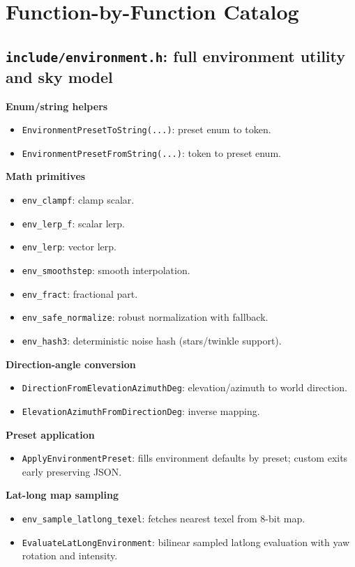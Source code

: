 \documentclass[11pt]{article}
\begin{document}
\section{Function-by-Function Catalog}
\subsection{\texttt{include/environment.h}: full environment utility and sky model}
\textbf{Enum/string helpers}
\begin{itemize}[leftmargin=1.5em]
  \item \verb|EnvironmentPresetToString(...)|: preset enum to token.
  \item \verb|EnvironmentPresetFromString(...)|: token to preset enum.
\end{itemize}

\textbf{Math primitives}
\begin{itemize}[leftmargin=1.5em]
  \item \verb|env_clampf|: clamp scalar.
  \item \verb|env_lerp_f|: scalar lerp.
  \item \verb|env_lerp|: vector lerp.
  \item \verb|env_smoothstep|: smooth interpolation.
  \item \verb|env_fract|: fractional part.
  \item \verb|env_safe_normalize|: robust normalization with fallback.
  \item \verb|env_hash3|: deterministic noise hash (stars/twinkle support).
\end{itemize}

\textbf{Direction-angle conversion}
\begin{itemize}[leftmargin=1.5em]
  \item \verb|DirectionFromElevationAzimuthDeg|: elevation/azimuth to world direction.
  \item \verb|ElevationAzimuthFromDirectionDeg|: inverse mapping.
\end{itemize}

\textbf{Preset application}
\begin{itemize}[leftmargin=1.5em]
  \item \verb|ApplyEnvironmentPreset|: fills environment defaults by preset; custom exits early preserving JSON.
\end{itemize}

\textbf{Lat-long map sampling}
\begin{itemize}[leftmargin=1.5em]
  \item \verb|env_sample_latlong_texel|: fetches nearest texel from 8-bit map.
  \item \verb|EvaluateLatLongEnvironment|: bilinear sampled latlong evaluation with yaw rotation and intensity.
\end{itemize}
\end{document}
